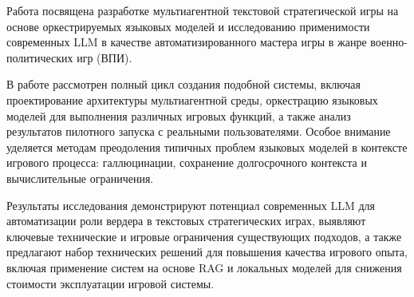 Работа посвящена разработке мультиагентной текстовой стратегической игры на основе оркестрируемых языковых моделей и исследованию применимости современных LLM в качестве автоматизированного мастера игры в жанре военно-политических игр (ВПИ).

В работе рассмотрен полный цикл создания подобной системы, включая проектирование архитектуры мультиагентной среды, оркестрацию языковых моделей для выполнения различных игровых функций, а также анализ результатов пилотного запуска с реальными пользователями. Особое внимание уделяется методам преодоления типичных проблем языковых моделей в контексте игрового процесса: галлюцинации, сохранение долгосрочного контекста и вычислительные ограничения.

Результаты исследования демонстрируют потенциал современных LLM для автоматизации роли вердера в текстовых стратегических играх, выявляют ключевые технические и игровые ограничения существующих подходов, а также предлагают набор технических решений для повышения качества игрового опыта, включая применение систем на основе RAG и локальных моделей для снижения стоимости эксплуатации игровой системы.